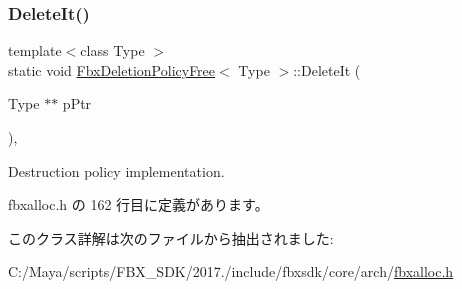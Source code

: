 \subsubsection{\texorpdfstring{Delete\+It()}{DeleteIt()}}
{\footnotesize\ttfamily template$<$class Type $>$ \\
static void \hyperlink{class_fbx_deletion_policy_free}{Fbx\+Deletion\+Policy\+Free}$<$ Type $>$\+::Delete\+It (\begin{DoxyParamCaption}\item[{Type $\ast$$\ast$}]{p\+Ptr }\end{DoxyParamCaption})\hspace{0.3cm}{\ttfamily [inline]}, {\ttfamily [static]}}



Destruction policy implementation. 



 fbxalloc.\+h の 162 行目に定義があります。



このクラス詳解は次のファイルから抽出されました\+:\begin{DoxyCompactItemize}
\item 
C\+:/\+Maya/scripts/\+F\+B\+X\+\_\+\+S\+D\+K/2017./include/fbxsdk/core/arch/\hyperlink{fbxalloc_8h}{fbxalloc.\+h}\end{DoxyCompactItemize}
